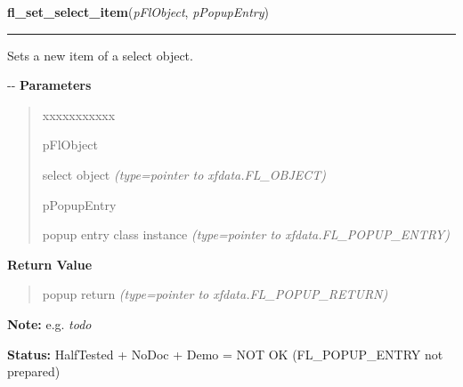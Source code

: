 \hspace{.8\funcindent}\begin{boxedminipage}{\funcwidth}

    \raggedright \textbf{fl\_set\_select\_item}(\textit{pFlObject}, \textit{pPopupEntry})

    \vspace{-1.5ex}

    \rule{\textwidth}{0.5\fboxrule}
\setlength{\parskip}{2ex}

Sets a new item of a select object.

-{}-
\setlength{\parskip}{1ex}
      \textbf{Parameters}
      \vspace{-1ex}

      \begin{quote}
        \begin{Ventry}{xxxxxxxxxxx}

          \item[pFlObject]


select object
            {\it (type=pointer to xfdata.FL\_OBJECT)}

          \item[pPopupEntry]


popup entry class instance
            {\it (type=pointer to xfdata.FL\_POPUP\_ENTRY)}

        \end{Ventry}

      \end{quote}

      \textbf{Return Value}
    \vspace{-1ex}

      \begin{quote}

popup return
      {\it (type=pointer to xfdata.FL\_POPUP\_RETURN)}

      \end{quote}

\textbf{Note:} 
e.g. \emph{todo}


\textbf{Status:} 
HalfTested + NoDoc + Demo = NOT OK (FL\_POPUP\_ENTRY not prepared)


    \end{boxedminipage}

    \label{xformslib:flselect:fl_get_select_item_by_value}

    \vspace{0.5ex}

